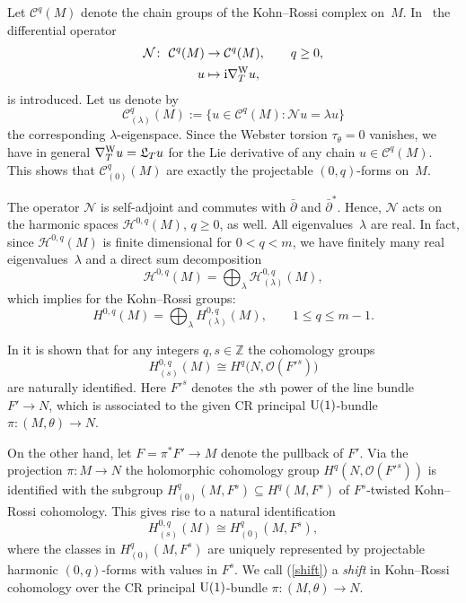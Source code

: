 \documentclass[10pt,a4paper]{amsart}
\numberwithin{equation}{section}
\newcommand{\ZZ}{\mathbb{Z}}
\begin{document}
Let $\mathcal{C}^q(M)$ denote the chain groups of the Kohn--Rossi complex on~$M$. In~\cite{Tan} the differential operator
\begin{align*}
\mathcal{N}\colon \ \mathcal{C}^q(M)&\to \mathcal{C}^q(M),\qquad q\geq 0,\\
u&\mapsto {\rm i}\nabla^{\rm W}_Tu,
\end{align*}
is introduced. Let us denote by
\[
\mathcal{C}_{(\lambda)}^q(M) := \big\{u\in \mathcal{C}^q(M)\colon \mathcal{N}u= \lambda u\big\}
\]
the corresponding $\lambda$-eigenspace.
Since the Webster torsion $\tau_\theta=0$ vanishes, we have in general
$\nabla^{\rm W}_Tu = \mathfrak{L}_Tu$ for the Lie derivative of any chain $u\in\mathcal{C}^q(M)$. This shows that
$\mathcal{C}_{(0)}^q(M)$ are exactly the projectable $(0,q)$-forms on~$M$.

The operator $\mathcal{N}$ is self-adjoint and commutes with $\bar{\partial}$ and $\bar{\partial}^*$.
Hence, $\mathcal{N}$ acts on the harmonic spaces $\mathcal{H}^{0,q}(M)$, $q\geq 0$, as well. All eigenvalues~$\lambda$ are real.
In fact, since $\mathcal{H}^{0,q}(M)$ is finite dimensional for $0<q<m$, we have finitely many real eigenvalues~$\lambda$ and a direct sum decomposition
\[\mathcal{H}^{0,q}(M) = \bigoplus_{\lambda} \mathcal{H}_{(\lambda)}^{0,q}(M) ,
\]
which implies for the Kohn--Rossi groups:
\[
H^{0,q}(M) = \bigoplus_{\lambda} H_{(\lambda)}^{0,q}(M),\qquad 1\leq q\leq m-1 .
\]

In \cite{Tan} it is shown that for any integers $q,s\in\ZZ$ the cohomology groups
\begin{equation*}%
H_{(s)}^{0,q}(M) \cong H^q\big(N,\mathcal{O}(F'^s)\big)
\end{equation*}
are naturally identified. Here $F'^s$ denotes the $s$th power of the line bundle $F'\to N$, which is associated to
the given CR principal ${\rm U}(1)$-bundle $\pi\colon (M,\theta)\to N$.

On the other hand, let $F=\pi^*F'\to M$ denote the pullback of $F'$.
Via the projection $\pi\colon M\to N$ the holomorphic cohomology group $H^q(N,\mathcal{O}(F'^s))$ is identified with
the subgroup $H_{(0)}^{q}(M,F^s)\subseteq H^{q}(M,F^s)$ of $F^s$-twisted Kohn--Rossi cohomology. This gives rise to a natural identification
\begin{equation}\label{shift}
H_{(s)}^{0,q}(M) \cong H^q_{(0)}(M,F^s) ,
\end{equation}
where the classes in $H^q_{(0)}(M,F^s)$ are uniquely represented by projectable harmonic $(0,q)$-forms
with values in $F^s$. We call (\ref{shift}) a {\em shift} in Kohn--Rossi cohomology over the CR principal ${\rm U}(1)$-bundle $\pi\colon (M,\theta)\to N$.
\end{document}

